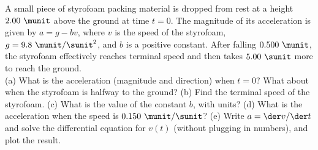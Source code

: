 A small piece of styrofoam packing material is dropped from rest at a
height $2.00\ \munit$ above the ground at time $t=0$.
The magnitude of its acceleration is given by $a = g - bv$, where $v$
is the speed of the styrofoam, $g = 9.8\ \munit/\sunit^2$, and $b$
is a positive constant. After falling $0.500\ \munit$,
the styrofoam effectively reaches terminal speed and then takes 
$5.00\ \sunit$ more to reach the ground.\\
%
(a) What is the acceleration (magnitude and direction) when $t=0$?
What about when the styrofoam is halfway to the ground?\hwendpart
%
(b) Find the terminal speed of the styrofoam. \answercheck\hwendpart
%
(c) What is the value of the constant $b$, with units?\answercheck\hwendpart
%
(d) What is the acceleration when the speed is $0.150\ \munit/\sunit$?
\answercheck\hwendpart
%
(e) Write $a = \der v/\der t$ and solve the differential equation for $v(t)$
(without plugging in numbers), and plot the result.\answercheck
